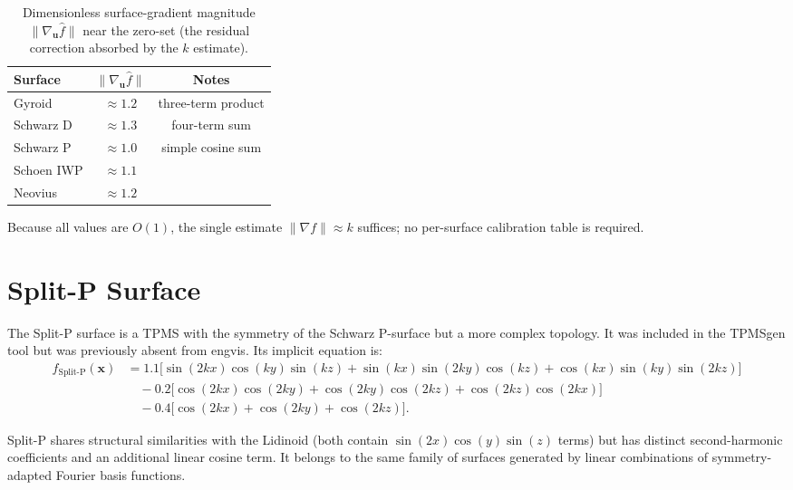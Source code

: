 \documentclass[11pt]{article}
\begin{document}
\begin{table}[h]
\centering
\caption{Dimensionless surface-gradient magnitude
$\|\nabla_{\mathbf{u}}\hat f\|$ near the zero-set (the residual
correction absorbed by the $k$ estimate).}
\label{tab:calibration}
\begin{tabular}{lcc}
\toprule
\textbf{Surface} & $\|\nabla_{\mathbf{u}}\hat f\|$ & \textbf{Notes} \\
\midrule
Gyroid           & $\approx 1.2$ & three-term product \\
Schwarz D        & $\approx 1.3$ & four-term sum \\
Schwarz P        & $\approx 1.0$ & simple cosine sum \\
Schoen IWP       & $\approx 1.1$ & \\
Neovius          & $\approx 1.2$ & \\
\bottomrule
\end{tabular}
\end{table}

Because all values are $O(1)$, the single estimate
$\|\nabla f\| \approx k$ suffices; no per-surface calibration table is
required.

\section{Split-P Surface}\label{sec:split-p}

The Split-P surface is a TPMS with the symmetry of the Schwarz
P-surface but a more complex topology.  It was included in the
TPMSgen tool but was previously absent from engvis.  Its implicit
equation is:
\begin{equation}\label{eq:split-p}
\begin{aligned}
  f_{\text{Split-P}}(\mathbf{x}) &=
    1.1\bigl[\sin(2kx)\cos(ky)\sin(kz)
           + \sin(kx)\sin(2ky)\cos(kz)
           + \cos(kx)\sin(ky)\sin(2kz)\bigr] \\
  &\quad - 0.2\bigl[\cos(2kx)\cos(2ky)
                   + \cos(2ky)\cos(2kz)
                   + \cos(2kz)\cos(2kx)\bigr] \\
  &\quad - 0.4\bigl[\cos(2kx) + \cos(2ky) + \cos(2kz)\bigr].
\end{aligned}
\end{equation}

Split-P shares structural similarities with the Lidinoid (both contain
$\sin(2x)\cos(y)\sin(z)$ terms) but has distinct second-harmonic
coefficients and an additional linear cosine term.  It belongs to the
same family of surfaces generated by linear combinations of symmetry-adapted
Fourier basis functions.
\end{document}
